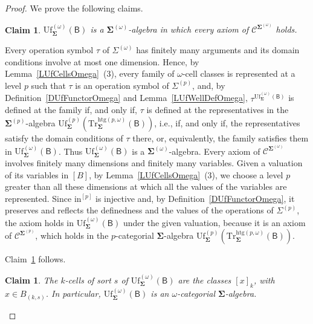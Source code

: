 \documentclass[a4paper, reqno]{amsbook}
\newcommand{\sig}[1]{\mathbf{#1}}             %
\newcommand{\calg}[1]{\boldsymbol{\mathsf{#1}}} %
\newcommand{\spec}[1]{\boldsymbol{\mathcal{#1}}} %
\newcommand{\htg}{\mathrm{htg}}                %
\newcommand{\Uf}{\mathrm{Uf}}
\newcommand{\Tr}{\mathrm{Tr}}
\theoremstyle{plain}
\newtheorem{claim}[theorem]{Claim}
\theoremstyle{definition}
\begin{document}
\begin{proof}
We prove the following claims.

\begin{claim}\label{ClUfFunctorOmegaA}
$\Uf^{(\omega)}_{\sig{\Sigma}}(\calg{B})$ is a $\sig{\Sigma}^{(\omega)}$-algebra in which every axiom of $\spec{C}^{\sig{\Sigma}^{(\omega)}}$ holds.
\end{claim}
Every operation symbol $\tau$ of $\Sigma^{(\omega)}$ has finitely many arguments and its domain conditions involve at most one dimension.
Hence, by Lemma~\ref{LUfCellsOmega}~(3), every family of $\omega$-cell classes is represented at a level $p$ such that $\tau$ is an operation symbol of $\Sigma^{(p)}$, and, by Definition~\ref{DUfFunctorOmega} and Lemma~\ref{LUfWellDefOmega}, $\tau^{\Uf^{(\omega)}_{\sig{\Sigma}}(\calg{B})}$ is defined at the family if, and only if, $\tau$ is defined at the representatives in the $\sig{\Sigma}^{(p)}$-algebra $\Uf^{(p)}_{\sig{\Sigma}}(\Tr^{\htg(p,\omega)}_{\sig{\Sigma}}(\calg{B}))$, i.e., if, and only if, the representatives satisfy the domain conditions of $\tau$ there, or, equivalently, the family satisfies them in $\Uf^{(\omega)}_{\sig{\Sigma}}(\calg{B})$.
Thus $\Uf^{(\omega)}_{\sig{\Sigma}}(\calg{B})$ is a $\sig{\Sigma}^{(\omega)}$-algebra.
Every axiom of $\spec{C}^{\sig{\Sigma}^{(\omega)}}$ involves finitely many dimensions and finitely many variables.
Given a valuation of its variables in $[B]$, by Lemma~\ref{LUfCellsOmega}~(3), we choose a level $p$ greater than all these dimensions at which all the values of the variables are represented.
Since $\mathrm{in}^{[p]}$ is injective and, by Definition~\ref{DUfFunctorOmega}, it preserves and reflects the definedness and the values of the operations of $\Sigma^{(p)}$, the axiom holds in $\Uf^{(\omega)}_{\sig{\Sigma}}(\calg{B})$ under the given valuation, because it is an axiom of $\spec{C}^{\sig{\Sigma}^{(p)}}$, which holds in the $p$-categorial $\sig{\Sigma}$-algebra $\Uf^{(p)}_{\sig{\Sigma}}(\Tr^{\htg(p,\omega)}_{\sig{\Sigma}}(\calg{B}))$.

Claim~\ref{ClUfFunctorOmegaA} follows.

\begin{claim}\label{ClUfFunctorOmegaB}
The $k$-cells of sort $s$ of $\Uf^{(\omega)}_{\sig{\Sigma}}(\calg{B})$ are the classes $[x]_{k}$, with $x\in B_{(k,s)}$.
In particular, $\Uf^{(\omega)}_{\sig{\Sigma}}(\calg{B})$ is an $\omega$-categorial $\sig{\Sigma}$-algebra.
\end{claim}


\end{proof}
\end{document}

